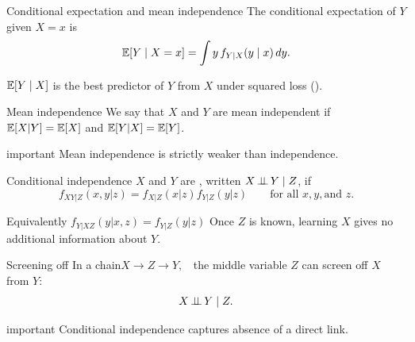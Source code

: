 \documentclass[dvipsnames,aspectratio=169,handout]{beamer}
\begin{document}
\begin{frame}{Conditional expectation and mean independence}
The conditional expectation of $Y$ given $X=x$ is
\[
\mathbb{E}[Y\mid X=x]=\int y\,f_{Y|X}(y\mid x)\,dy.
\]

\begin{block}{}
\qquad $\mathbb{E}[Y\mid X]$ is the best predictor of $Y$ from $X$ under squared loss ().\\[2mm]
\end{block}

\begin{alertblock}{Mean independence}
We say that $X$ and $Y$ are mean independent if $\mathbb{E}[X|Y]=\mathbb{E}[X]$ and $\mathbb{E}[Y|X]=\mathbb{E}[Y]$.
\end{alertblock}
\medskip
\begin{beamercolorbox}[wd=\textwidth,sep=7pt,center,rounded=true,shadow=true]{important}
Mean independence is strictly weaker than independence.
\end{beamercolorbox}
\end{frame}

\begin{frame}{Conditional independence}
$X$ and $Y$ are , written $X\mbox{\,$\perp\!\!\!\perp$\,} Y\mid Z$, if
\[
f_{XY|Z}(x,y|z)=f_{X|Z}(x|z)f_{Y|Z}(y|z)
\qquad\mbox{for all }x,y, \mbox{and }z.
\]

\begin{block}{Equivalently $f_{Y|XZ}(y|x,z)=f_{Y|Z}(y|z)$}
Once $Z$ is known, learning $X$ gives no additional information about $Y$.
\end{block}

\begin{alertblock}{Screening off}
In a chain\;\;\;$
X \longrightarrow Z \longrightarrow Y,\;\;
$
the middle variable $Z$ can screen off $X$ from $Y$:
\[
X\mbox{\,$\perp\!\!\!\perp$\,} Y\mid Z.
\]
\end{alertblock}\vspace{-3mm}
\begin{beamercolorbox}[wd=\textwidth,sep=8pt,center,rounded=true,shadow=true]{important}
Conditional independence captures absence of a direct link.
\end{beamercolorbox}
\end{frame}
\end{document}
